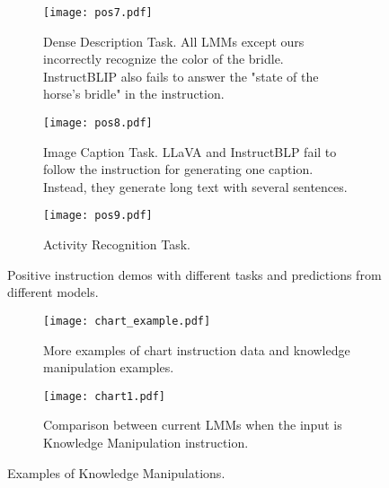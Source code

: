 \begin{figure}
     \centering
     \begin{subfigure}[b]{\textwidth}
         \centering
         \texttt{[image: pos7.pdf]}
         \caption{Dense Description Task. All LMMs except ours incorrectly recognize the color of the bridle. InstructBLIP also fails to answer the "state of the horse's bridle" in the instruction.}
         \label{fig:demo3_pos1}
     \end{subfigure}
     \par\bigskip
     \begin{subfigure}[b]{\textwidth}
         \centering
         \texttt{[image: pos8.pdf]}
         \caption{Image Caption Task. LLaVA and InstructBLP fail to follow the instruction for generating one caption. Instead, they generate long text with several sentences.}
         \label{fig:demo3_pos2}
     \end{subfigure}
     \par\bigskip
     \begin{subfigure}[b]{\textwidth}
         \centering
         \texttt{[image: pos9.pdf]}
         \caption{Activity Recognition Task.}
         \label{fig:demo3_pos3}
     \end{subfigure}
        \caption{Positive instruction demos with different tasks and predictions from different models. }
        \label{fig:demo_pos3}
\end{figure}

\begin{figure}
     \centering
     \begin{subfigure}[b]{\textwidth}
         \centering
         \texttt{[image: chart\_example.pdf]}
         \caption{More examples of chart instruction data and knowledge manipulation examples.}
         \label{fig:demo_chart33}
     \end{subfigure}
     \par\bigskip
     \begin{subfigure}[b]{\textwidth}
         \centering
         \texttt{[image: chart1.pdf]}
         \caption{Comparison between current LMMs when the input is Knowledge Manipulation instruction.}
         \label{fig:demo_chart11}
     \end{subfigure}
      \caption{Examples of Knowledge Manipulations. }
        \label{fig:demo_chart_example1}
     
\end{figure}
